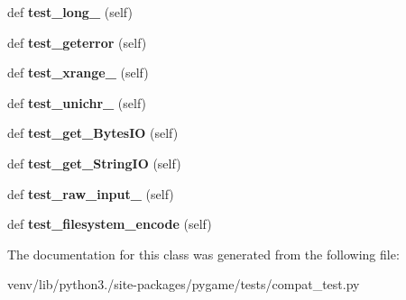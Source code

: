 \begin{DoxyCompactItemize}
def {\bfseries test\+\_\+long\+\_\+} (self)
\item 
\mbox{\label{classpygame_1_1tests_1_1compat__test_1_1_compat_module_test_aa2e790c97cbb92fc34dc3162fcdf6c92}} 
def {\bfseries test\+\_\+geterror} (self)
\item 
\mbox{\label{classpygame_1_1tests_1_1compat__test_1_1_compat_module_test_afe7084aa51ad7b82b7946c9629f8912e}} 
def {\bfseries test\+\_\+xrange\+\_\+} (self)
\item 
\mbox{\label{classpygame_1_1tests_1_1compat__test_1_1_compat_module_test_a013572e8afa198c56552dfba680a19af}} 
def {\bfseries test\+\_\+unichr\+\_\+} (self)
\item 
\mbox{\label{classpygame_1_1tests_1_1compat__test_1_1_compat_module_test_a397cbd0c476e0de9fefde85ef7090629}} 
def {\bfseries test\+\_\+get\+\_\+\+Bytes\+IO} (self)
\item 
\mbox{\label{classpygame_1_1tests_1_1compat__test_1_1_compat_module_test_ad424a7199d66878d6a19c0484d62202c}} 
def {\bfseries test\+\_\+get\+\_\+\+String\+IO} (self)
\item 
\mbox{\label{classpygame_1_1tests_1_1compat__test_1_1_compat_module_test_a39d564b40adf81e339a93bcf48daf662}} 
def {\bfseries test\+\_\+raw\+\_\+input\+\_\+} (self)
\item 
\mbox{\label{classpygame_1_1tests_1_1compat__test_1_1_compat_module_test_ab8168b8e1f890976345129c7a87421a0}} 
def {\bfseries test\+\_\+filesystem\+\_\+encode} (self)
\end{DoxyCompactItemize}


The documentation for this class was generated from the following file\+:\begin{DoxyCompactItemize}
\item 
venv/lib/python3./site-\/packages/pygame/tests/compat\+\_\+test.\+py\end{DoxyCompactItemize}
